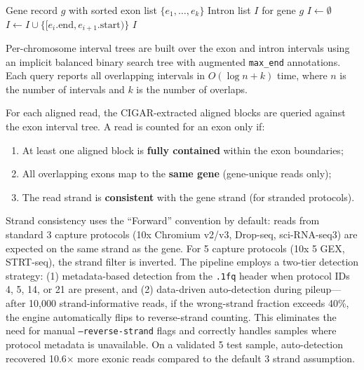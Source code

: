 \documentclass[11pt,a4paper]{article}
\begin{document}
\begin{algorithm}[t]
\caption{Intron inference from GTF gene model}\label{alg:intron}
\begin{algorithmic}[1]
\Require Gene record $g$ with sorted exon list $\{e_1, \ldots, e_k\}$
\Ensure Intron list $I$ for gene $g$
\State $I \gets \emptyset$
        \State $I \gets I \cup \{[e_i.\text{end}, e_{i+1}.\text{start})\}$
    \EndIf
\EndFor
\State \Return $I$
\end{algorithmic}
\end{algorithm}

Per-chromosome interval trees are built over the exon and intron intervals using an implicit balanced binary search tree with augmented \texttt{max\_end} annotations. Each query reports all overlapping intervals in $O(\log n + k)$ time, where $n$ is the number of intervals and $k$ is the number of overlaps.

For each aligned read, the CIGAR-extracted aligned blocks are queried against the exon interval tree. A read is counted for an exon only if:
\begin{enumerate}
    \item At least one aligned block is \textbf{fully contained} within the exon boundaries;
    \item All overlapping exons map to the \textbf{same gene} (gene-unique reads only);
    \item The read strand is \textbf{consistent} with the gene strand (for stranded protocols).
\end{enumerate}
Strand consistency uses the ``Forward'' convention by default: reads from standard 3\textquotesingle{} capture protocols (10x Chromium v2/v3, Drop-seq, sci-RNA-seq3) are expected on the same strand as the gene.  For 5\textquotesingle{} capture protocols (10x 5\textquotesingle{} GEX, STRT-seq), the strand filter is inverted.  The pipeline employs a two-tier detection strategy: (1) metadata-based detection from the \texttt{.1fq} header when protocol IDs 4, 5, 14, or 21 are present, and (2) data-driven auto-detection during pileup---after 10{,}000 strand-informative reads, if the wrong-strand fraction exceeds 40\%, the engine automatically flips to reverse-strand counting.  This eliminates the need for manual \texttt{--reverse-strand} flags and correctly handles samples where protocol metadata is unavailable.  On a validated 5\textquotesingle{} test sample, auto-detection recovered 10.6$\times$ more exonic reads compared to the default 3\textquotesingle{} strand assumption.
\end{document}
